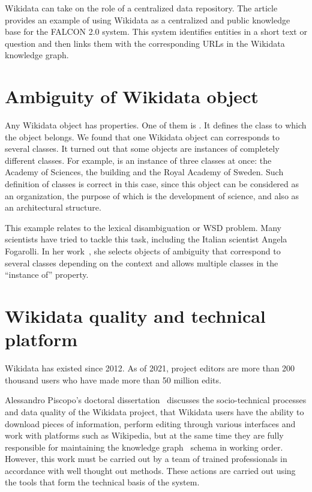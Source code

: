 Wikidata can take on the role of a centralized data repository. The article~ provides an example of using Wikidata as a centralized and public knowledge base for the FALCON 2.0 system. This system identifies entities in a short text or question and then links them with the corresponding URLs in the Wikidata knowledge graph.

\section{Ambiguity of Wikidata object}
Any Wikidata object has properties. One of them is . It defines the class to which the object belongs. 
We found that one Wikidata object can corresponds to several classes. 
It turned out that some objects are instances of completely different classes. For example,  is an instance of three classes at once: the Academy of Sciences, the building and the Royal Academy of Sweden. Such definition of classes is correct in this case, since this object can be considered as an organization, the purpose of which is the development of science, and also as an architectural structure.

This example relates to the lexical disambiguation or WSD problem. Many scientists have tried to tackle this task, including the Italian scientist Angela Fogarolli. In her work~, she selects objects of ambiguity that correspond to several classes depending on the context and allows multiple classes in the ``instance of'' property.

\section{Wikidata quality and technical platform}
Wikidata has existed since 2012. As of 2021, project editors are more than 200 thousand users who have made more than 50 million edits.

Alessandro Piscopo's doctoral dissertation~ discusses the socio-technical processes and data quality of the Wikidata project, that Wikidata users have the ability to download pieces of information, perform editing through various interfaces and work with platforms such as Wikipedia, but at the same time they are fully responsible for maintaining the knowledge graph~ schema in working order. However, this work must be carried out by a team of trained professionals in accordance with well thought out methods. These actions are carried out using the tools that form the technical basis of the system.

